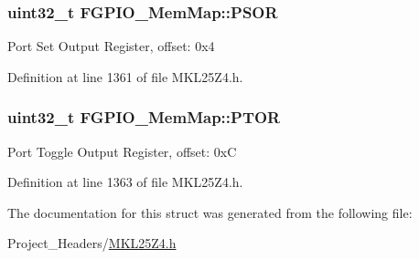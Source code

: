 \subsubsection[{\texorpdfstring{P\+S\+OR}{PSOR}}]{\setlength{\rightskip}{0pt plus 5cm}uint32\+\_\+t F\+G\+P\+I\+O\+\_\+\+Mem\+Map\+::\+P\+S\+OR}\hypertarget{struct_f_g_p_i_o___mem_map_a7179b85bd4a68dc196cb91b6433dd674}{}\label{struct_f_g_p_i_o___mem_map_a7179b85bd4a68dc196cb91b6433dd674}
Port Set Output Register, offset\+: 0x4 

Definition at line 1361 of file M\+K\+L25\+Z4.\+h.

\subsubsection[{\texorpdfstring{P\+T\+OR}{PTOR}}]{\setlength{\rightskip}{0pt plus 5cm}uint32\+\_\+t F\+G\+P\+I\+O\+\_\+\+Mem\+Map\+::\+P\+T\+OR}\hypertarget{struct_f_g_p_i_o___mem_map_aa07e31d4362b7c29a10592d24511198c}{}\label{struct_f_g_p_i_o___mem_map_aa07e31d4362b7c29a10592d24511198c}
Port Toggle Output Register, offset\+: 0xC 

Definition at line 1363 of file M\+K\+L25\+Z4.\+h.



The documentation for this struct was generated from the following file\+:\begin{DoxyCompactItemize}
\item 
Project\+\_\+\+Headers/\hyperlink{_m_k_l25_z4_8h}{M\+K\+L25\+Z4.\+h}\end{DoxyCompactItemize}
